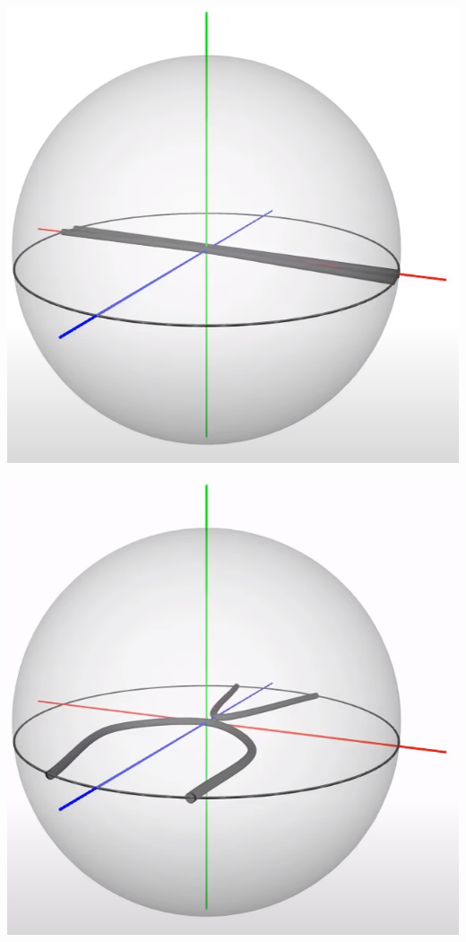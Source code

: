 \documentclass[10pt]{beamer}
\begin{document}
\begin{frame}
    \includegraphics[scale=0.1]{Pictures/4pisphere1.png}

    \includegraphics[scale=0.1]{Pictures/4pisphere2.png}


\end{frame}
\end{document}
